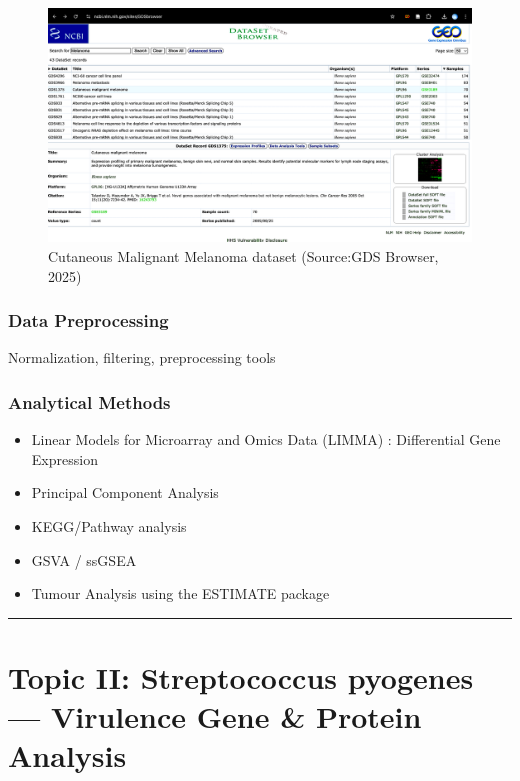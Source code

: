 \documentclass[
]{article}
\begin{document}
\begin{figure}

{\centering \includegraphics[width=0.9\linewidth]{Images/GEO_Data_2025-06-18 at 10.07.32} 

}

\caption{Cutaneous Malignant Melanoma dataset (Source:GDS Browser, 2025)}\label{fig:unnamed-chunk-14}
\end{figure}

\subsubsection{Data Preprocessing}\label{data-preprocessing}

Normalization, filtering, preprocessing tools

\subsubsection{Analytical Methods}\label{analytical-methods}

\begin{itemize}
\item
  Linear Models for Microarray and Omics Data (LIMMA) : Differential
  Gene Expression
\item
  Principal Component Analysis
\item
  KEGG/Pathway analysis
\item
  GSVA / ssGSEA
\item
  Tumour Analysis using the ESTIMATE package
\end{itemize}

\begin{center}\rule{0.5\linewidth}{0.5pt}\end{center}

\section{Topic II: Streptococcus pyogenes --- Virulence Gene \& Protein
Analysis}\label{topic-ii-streptococcus-pyogenes-virulence-gene-protein-analysis}
\end{document}
